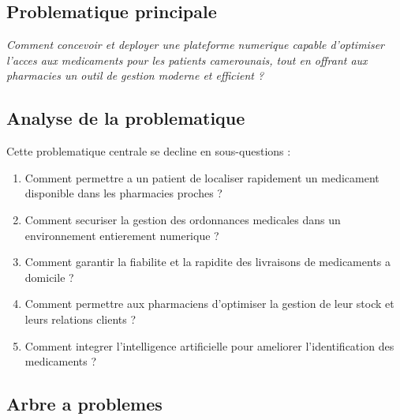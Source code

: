 \documentclass[12pt,a4paper]{report}
\begin{document}
\subsection{Problematique principale}

\begin{mdframed}[linecolor=vertpharma,linewidth=2pt,roundcorner=6pt,backgroundcolor=vertpharma!5,innertopmargin=14pt,innerbottommargin=14pt]
\centering\itshape\large
Comment concevoir et deployer une plateforme numerique capable d'optimiser
l'acces aux medicaments pour les patients camerounais, tout en offrant aux
pharmacies un outil de gestion moderne et efficient ?
\end{mdframed}

\subsection{Analyse de la problematique}

Cette problematique centrale se decline en sous-questions :

\begin{enumerate}[label=\textcolor{vertpharma}{\arabic*.},leftmargin=*]
    \item Comment permettre a un patient de localiser rapidement un medicament disponible dans les pharmacies proches ?
    \item Comment securiser la gestion des ordonnances medicales dans un environnement entierement numerique ?
    \item Comment garantir la fiabilite et la rapidite des livraisons de medicaments a domicile ?
    \item Comment permettre aux pharmaciens d'optimiser la gestion de leur stock et leurs relations clients ?
    \item Comment integrer l'intelligence artificielle pour ameliorer l'identification des medicaments ?
\end{enumerate}

\subsection{Arbre a problemes}
\end{document}

